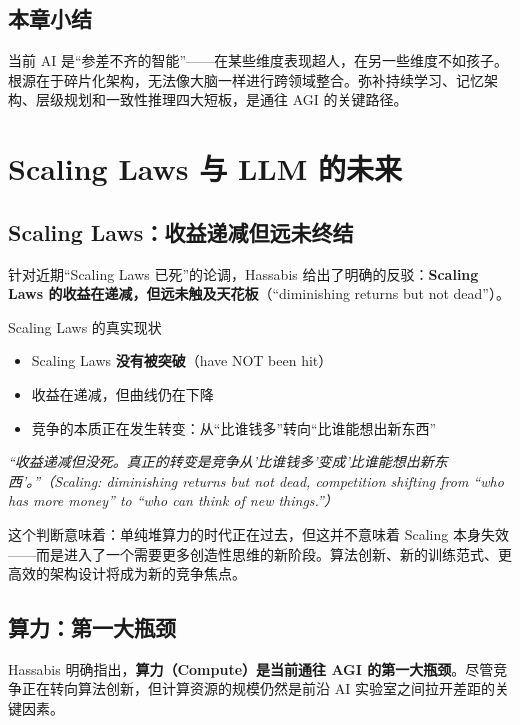 \documentclass[a4paper]{article}
\begin{document}
\subsection{本章小结}

当前 AI 是``参差不齐的智能''——在某些维度表现超人，在另一些维度不如孩子。根源在于碎片化架构，无法像大脑一样进行跨领域整合。弥补持续学习、记忆架构、层级规划和一致性推理四大短板，是通往 AGI 的关键路径。

\section{Scaling Laws 与 LLM 的未来}

\subsection{Scaling Laws：收益递减但远未终结}

针对近期``Scaling Laws 已死''的论调，Hassabis 给出了明确的反驳：\textbf{Scaling Laws 的收益在递减，但远未触及天花板}（``diminishing returns but not dead''）。

\begin{importantbox}{Scaling Laws 的真实现状}
\begin{itemize}
    \item Scaling Laws \textbf{没有被突破}（have NOT been hit）
    \item 收益在递减，但曲线仍在下降
    \item 竞争的本质正在发生转变：从``比谁钱多''转向``比谁能想出新东西''
\end{itemize}
\textit{``收益递减但没死。真正的转变是竞争从'比谁钱多'变成'比谁能想出新东西'。''（Scaling: diminishing returns but not dead, competition shifting from ``who has more money'' to ``who can think of new things.''）}
\end{importantbox}

这个判断意味着：单纯堆算力的时代正在过去，但这并不意味着 Scaling 本身失效——而是进入了一个需要更多创造性思维的新阶段。算法创新、新的训练范式、更高效的架构设计将成为新的竞争焦点。

\subsection{算力：第一大瓶颈}

Hassabis 明确指出，\textbf{算力（Compute）是当前通往 AGI 的第一大瓶颈}。尽管竞争正在转向算法创新，但计算资源的规模仍然是前沿 AI 实验室之间拉开差距的关键因素。
\end{document}
